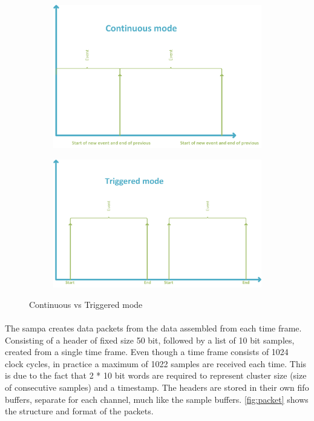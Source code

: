 \documentclass[a4paper, 12pt]{report}
\begin{document}
\begin{figure}[t!]
	\centering
		\begin{subfigure}[]{0.9\textwidth}
			\label{fig:cont}
			\includegraphics[width=\textwidth]{images/cont-mode.png}
		\end{subfigure}
		\begin{subfigure}[]{0.9\textwidth}
			\label{fig:trig}
			\includegraphics[width=\textwidth]{images/triggered-mode.png}
		\end{subfigure}
	\caption{Continuous vs Triggered mode}
	\label{fig:cont-vs-trig}
\end{figure}

\paragraph{}
The \gls{sampa} creates data packets from the data assembled from each time frame.
Consisting of a header of fixed size 50 bit, followed by a list of 10 bit samples, created from a single time frame.
Even though a time frame consists of 1024 clock cycles, in practice a maximum of 1022 samples are received each time.
This is due to the fact that 2 * 10 bit words are required to represent cluster size (size of consecutive samples) and a timestamp.
The headers are stored in their own \gls{fifo} buffers, separate for each channel, much like the sample buffers.
\ref{fig:packet} shows the structure and format of the packets.
\end{document}
